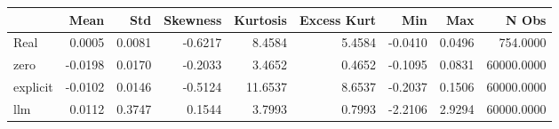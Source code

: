 \begin{tabular}{lrrrrrrrr}
\toprule
 & Mean & Std & Skewness & Kurtosis & Excess Kurt & Min & Max & N Obs \\
\midrule
Real & 0.0005 & 0.0081 & -0.6217 & 8.4584 & 5.4584 & -0.0410 & 0.0496 & 754.0000 \\
zero & -0.0198 & 0.0170 & -0.2033 & 3.4652 & 0.4652 & -0.1095 & 0.0831 & 60000.0000 \\
explicit & -0.0102 & 0.0146 & -0.5124 & 11.6537 & 8.6537 & -0.2037 & 0.1506 & 60000.0000 \\
llm & 0.0112 & 0.3747 & 0.1544 & 3.7993 & 0.7993 & -2.2106 & 2.9294 & 60000.0000 \\
\bottomrule
\end{tabular}
